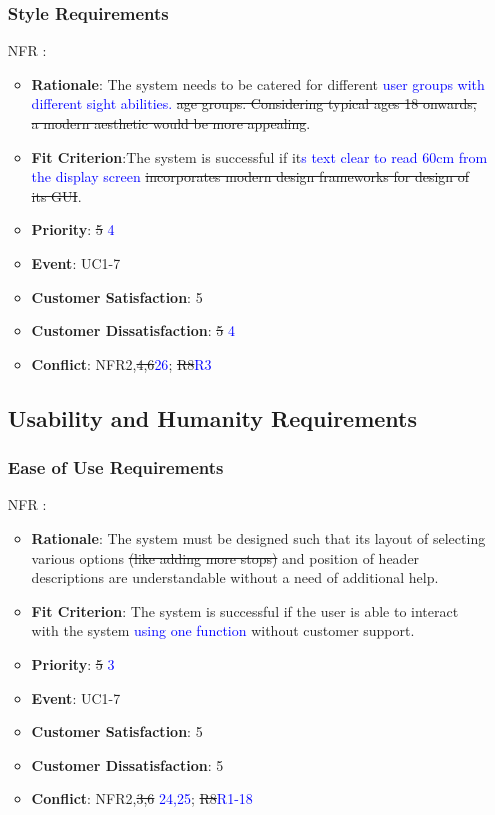 \documentclass[12pt, titlepage]{article}
\newcounter{reqnum} %
\newcounter{freqnum} %
\begin{document}
\begin{itemize}
\subsubsection{Style Requirements}
\item[NFR\refstepcounter{freqnum}\thefreqnum
\label{NFR}:] 
\begin{itemize}
    \item \textbf{Rationale}: The system needs to be catered for different \textcolor{blue}{user groups with different sight abilities.} \sout{age groups. Considering typical ages 18 onwards, a modern aesthetic would be more appealing}.
    \item \textbf{Fit Criterion}:The system is successful if it\textcolor{blue}{s text clear to read 60cm from the display screen} \sout{incorporates modern design frameworks for design of its GUI}.
    \item \textbf{Priority}: \sout{5} \textcolor{blue}{4}
    \item \textbf{Event}: UC1-7 %
    \item \textbf{Customer Satisfaction}: 5
    \item \textbf{Customer Dissatisfaction}: \sout{5} \textcolor{blue}{4}
    \item \textbf{Conflict}: NFR2,\sout{4,6}\textcolor{blue}{26}; \sout{R8}\textcolor{blue}{R3}
\end{itemize}
\subsection{Usability and Humanity Requirements}

\subsubsection{Ease of Use Requirements}

\item[NFR\refstepcounter{freqnum}\thefreqnum
\label{NFR}:] 
\begin{itemize}
    \item \textbf{Rationale}: The system must be designed such that its layout of selecting various options \sout{(like adding more stops)} and position of header descriptions are understandable without a need of additional help.
    \item \textbf{Fit Criterion}: The system is successful if the user is able to interact with the system \textcolor{blue}{using one function} without customer support.
    \item \textbf{Priority}: \sout{5} \textcolor{blue}{3}
    \item \textbf{Event}: UC1-7%
    \item \textbf{Customer Satisfaction}: 5
    \item \textbf{Customer Dissatisfaction}: 5
    \item \textbf{Conflict}: NFR2,\sout{3,6} \textcolor{blue}{24,25}; \sout{R8}\textcolor{blue}{R1-18}
\end{itemize}

\end{itemize}
\end{document}
